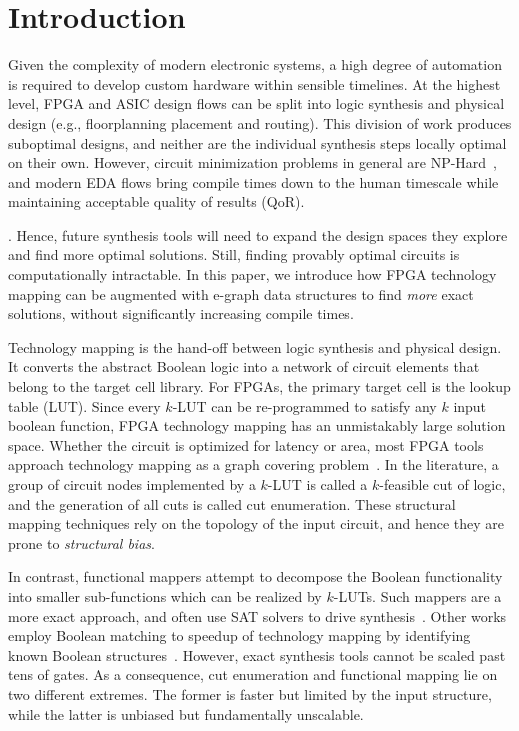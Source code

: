 \section{Introduction}\label{sec:intro}
Given the complexity of modern electronic systems, a high degree of automation
is required to develop custom hardware within sensible timelines. At the
highest level, FPGA and ASIC design flows can be split into logic synthesis and
physical design (e.g., floorplanning placement and routing). This division of
work produces suboptimal designs, and neither are the individual synthesis
steps locally optimal on their own. However, circuit minimization problems in
general are NP-Hard~\cite{logicmin,twolevellogic}, and modern EDA flows bring
compile times down to the human timescale while maintaining acceptable quality
of results (QoR).

.  Hence, future synthesis tools will
need to expand the design spaces they explore and find more optimal solutions.
Still, finding provably optimal circuits is computationally intractable. In
this paper, we introduce how FPGA technology mapping can be augmented with
e-graph data structures to find \textit{more} exact solutions, without
significantly increasing compile times.

Technology mapping is the hand-off between logic synthesis and physical design.
It converts the abstract Boolean logic into a network of circuit elements that
belong to the target cell library. For FPGAs, the primary target cell is the
lookup table (LUT). Since every $k$-LUT can be re-programmed to satisfy any $k$
input boolean function, FPGA technology mapping has an unmistakably large
solution space. Whether the circuit is optimized for latency or area, most FPGA
tools approach technology mapping as a graph covering problem~\cite{flowmap,
    daomap, attmap, imap}. In the literature, a group of circuit nodes implemented
by a $k$-LUT is called a $k$-feasible cut of logic, and the generation of all
cuts is called cut enumeration. These structural mapping techniques rely on the
topology of the input circuit, and hence they are prone to \textit{structural
    bias}.

In contrast, functional mappers attempt to decompose the Boolean functionality
into smaller sub-functions which can be realized by $k$-LUTs. Such mappers are
a more exact approach, and often use SAT solvers to drive
synthesis~\cite{satmap,satmap2}. Other works employ Boolean matching to speedup
of technology mapping by identifying known Boolean
structures~\cite{boolmatch,fastboolmatch}. However, exact synthesis tools
cannot be scaled past tens of gates. As a consequence, cut enumeration and
functional mapping lie on two different extremes. The former is faster but
limited by the input structure, while the latter is unbiased but fundamentally
unscalable.

